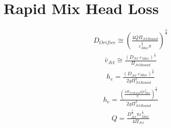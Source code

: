 \documentclass[letterpaper,10pt,english]{sphinxmanual}
\begin{document}
\section{Rapid Mix Head Loss}
\label{\detokenize{Rapid_Mix/RM_Design:rapid-mix-head-loss}}\begin{equation}\label{equation:Rapid_Mix/RM_Design:Rapid_Mix/RM_Design:5}
\begin{split}D_{Orifice} \cong \left( \frac{4 Q \Pi_{JetRound}}{\varepsilon_{Max}^{\frac{1}{3}} \pi} \right)^{\frac{3}{7}}\end{split}
\end{equation}\begin{equation}\label{equation:Rapid_Mix/RM_Design:Rapid_Mix/RM_Design:6}
\begin{split}\bar v_{Jet} \cong \frac{\left( D_{Jet} \, \varepsilon_{Max} \right)^{\frac{1}{3}}}{\Pi_{JetRound}}\end{split}
\end{equation}\begin{equation}\label{equation:Rapid_Mix/RM_Design:Rapid_Mix/RM_Design:7}
\begin{split}h_e = \frac{ \left( D_{Jet} \, \varepsilon_{Max} \right)^{\frac{2}{3}}}{ 2g \Pi_{JetRound}^2}\end{split}
\end{equation}\begin{equation}\label{equation:Rapid_Mix/RM_Design:Rapid_Mix/RM_Design:8}
\begin{split}h_e = \frac{ \left( \frac{4 \Pi_{JetRound} Q \varepsilon_{Max}^2}{\pi} \right)^{\frac{2}{7}}}{2 g \Pi_{JetRound}^2}\end{split}
\end{equation}
\begin{equation}\label{equation:Rapid_Mix/RM_Design:Rapid_Mix/RM_Design:9}
\begin{split}Q = \frac{D_{Jet}^{\frac{7}{3}} \pi \varepsilon_{Max}^{\frac{1}{3}}}{4 \Pi_{Jet}}\end{split}
\end{equation}
%
\begin{sphinxVerbatim}[commandchars=\\\{\}]
  
  
    
 
\end{sphinxVerbatim}
\end{document}
